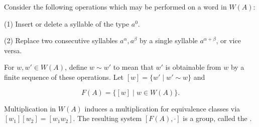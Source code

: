 Consider the following operations which may be performed on a word in $W(A)$:

(1) Insert or delete a syllable of the type $a^0$.

(2) Replace two consecutive syllables $a^\alpha, a^\beta$ by a single syllable $a^{\alpha+\beta}$, or vice versa.

For $w, w' \in W(A)$, define $w \sim w'$ to mean that $w'$ is obtainable from $w$ by a finite sequence of these operations. Let $[w] = \{w' \mid w' \sim w\}$ and

$$F(A) = \{[w] \mid w \in W(A)\}.$$

Multiplication in $W(A)$ induces a multiplication for equivalence classes via $[w_1][w_2] = [w_1w_2]$. The resulting system $[F(A), \cdot]$ is a group, called the .
